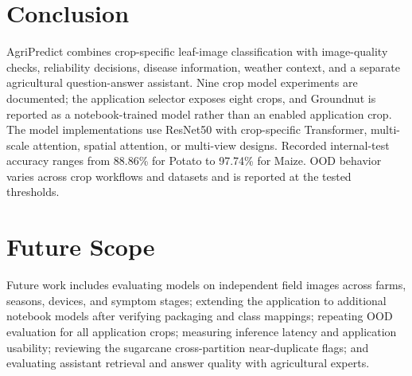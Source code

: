 \documentclass[12pt,a4paper,oneside]{report}
\begin{document}
\section{Conclusion}
AgriPredict combines crop-specific leaf-image classification with image-quality checks, reliability decisions, disease information, weather context, and a separate agricultural question-answer assistant. Nine crop model experiments are documented; the application selector exposes eight crops, and Groundnut is reported as a notebook-trained model rather than an enabled application crop. The model implementations use ResNet50 with crop-specific Transformer, multi-scale attention, spatial attention, or multi-view designs. Recorded internal-test accuracy ranges from 88.86\% for Potato to 97.74\% for Maize. OOD behavior varies across crop workflows and datasets and is reported at the tested thresholds.
\section{Future Scope}
Future work includes evaluating models on independent field images across farms, seasons, devices, and symptom stages; extending the application to additional notebook models after verifying packaging and class mappings; repeating OOD evaluation for all application crops; measuring inference latency and application usability; reviewing the sugarcane cross-partition near-duplicate flags; and evaluating assistant retrieval and answer quality with agricultural experts.


\end{document}
